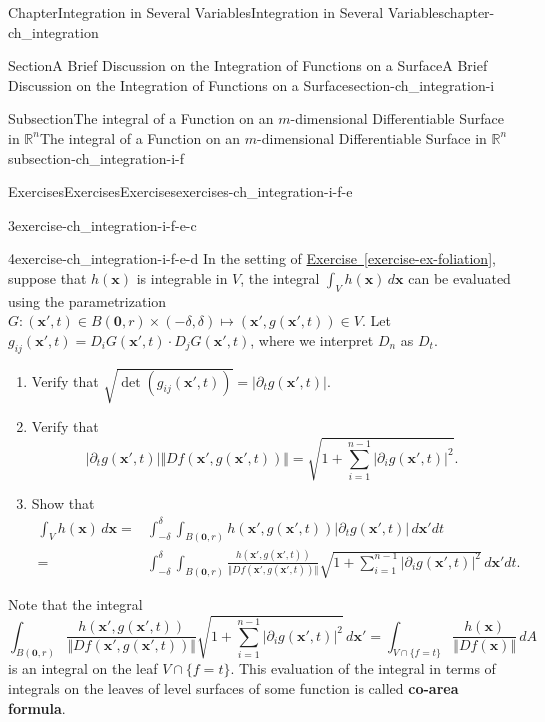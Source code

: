 \documentclass[oneside,10pt,]{book}
\newcommand{\xreffont}{\relax}
\newcommand{\terminology}[1]{\textbf{#1}}
\numberwithin{equation}{section}
\newcommand{\bx}{\mathbf{x}}
\newcommand{\bbR}{\mathbb{R}}
\newcommand{\amp}{&}
\begin{document}
\begin{chapterptx}{Chapter}{Integration in Several Variables}{}{Integration in Several Variables}{}{}{chapter-ch_integration}
\begin{sectionptx}{Section}{A Brief Discussion on the Integration of Functions on a Surface}{}{A Brief Discussion on the Integration of Functions on a Surface}{}{}{section-ch_integration-i}
\begin{subsectionptx}{Subsection}{The integral of a Function on an \(m\)-dimensional Differentiable Surface in \(\bbR^{n}\)}{}{The integral of a Function on an \(m\)-dimensional Differentiable Surface in \(\bbR^{n}\)}{}{}{subsection-ch_integration-i-f}
\begin{exercises-subsubsection-numberless}{Exercises}{Exercises}{}{Exercises}{}{}{exercises-ch_integration-i-f-e}
\begin{divisionexercise}{3}{}{}{exercise-ch_integration-i-f-e-c}
\end{divisionexercise}%
\begin{divisionexercise}{4}{}{}{exercise-ch_integration-i-f-e-d}%
In the setting of \hyperref[exercise-ex-foliation]{Exercise~{\xreffont\ref{exercise-ex-foliation}}}, suppose that \(h(\bx)\) is integrable in \(V\), the integral \(\int_{V} h(\bx) \, d\bx\) can be evaluated using the parametrization \(G: (\bx',t)\in  B(\mathbf 0, r) \times (-\delta, \delta) \mapsto (\bx', g(\bx', t))\in V\). Let \(g_{ij}(\bx', t) = D_{i}G(\bx', t)\cdot D_{j} G(\bx', t)\), where we interpret \(D_{n}\) as \(D_{t}\).%
%
\begin{enumerate}[label=(\alph*)]
\item{}Verify that \(\sqrt{\det(g_{ij}(\bx', t))}=\vert \partial_{t} g(\bx', t)\vert\).%
\item{}Verify that%
\begin{equation*}
\vert \partial_{t} g(\bx', t)\vert \Vert D f(\bx', g(\bx', t)) \Vert 
=\sqrt{1+\sum_{i=1}^{n-1}\vert \partial_{i}g(\bx', t)\vert^{2}}\text{.}
\end{equation*}
%
\item{}Show that%
\begin{align*}
\int_{V} h(\bx) \, d\bx=\amp \int_{- \delta}^{\delta} \int_{B(\mathbf 0, r)} h(\bx', g(\bx', t)) 
\vert \partial_{t} g(\bx', t)\vert \, d\bx' dt \\
=\amp \int_{- \delta}^{\delta} \int_{B(\mathbf 0, r)} \frac{h(\bx', g(\bx', t))}{\Vert D f(\bx', g(\bx', t)) \Vert}
\sqrt{1+\sum_{i=1}^{n-1}\vert \partial_{i}g(\bx', t)\vert^{2}} \, d\bx' dt. 
\end{align*}
%
\end{enumerate}
Note that the integral%
\begin{equation*}
\int_{B(\mathbf 0, r)} \frac{h(\bx', g(\bx', t))}{\Vert D f(\bx', g(\bx', t)) \Vert}
\sqrt{1+\sum_{i=1}^{n-1}\vert \partial_{i}g(\bx', t)\vert^{2}} \, d\bx'
=\int_{V\cap \{f =t\}} \frac{h(\bx)}{\Vert D f(\bx) \Vert} \, d A
\end{equation*}
is an integral on the leaf \(V\cap \{f =t\}\).  This evaluation of the integral in terms of integrals on the leaves of level surfaces of some function is called \terminology{co-area formula}.%
\par

\end{divisionexercise}
\end{exercises-subsubsection-numberless}
\end{subsectionptx}
\end{sectionptx}
\end{chapterptx}
\end{document}
